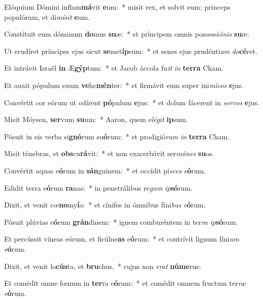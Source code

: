 \item Elóquium Dómini inflam\textbf{má}vit \textbf{e}um:~* misit rex, et solvit eum; princeps populórum, et di\textit{mí}\textit{sit} \textbf{e}um.
\item Constítuit eum dóminum \textbf{do}mus \textbf{su}æ:~* et príncipem omnis possessi\textit{ó}\textit{nis} \textbf{su}æ:
\item Ut erudíret príncipes ejus sicut \textbf{se}met\textbf{íp}sum:~* et senes ejus prudénti\textit{am} \textit{do}\textbf{cé}ret.
\item Et intrávit Israël \textbf{in} Æ\textbf{gýp}tum:~* et Jacob áccola fu\textit{it} \textit{in} \textbf{ter}\textbf{ra} Cham.
\item Et auxit pópulum suum \textbf{ve}he\textbf{mén}ter:~* et firmávit eum super ini\textit{mí}\textit{cos} \textbf{e}jus.
\item Convértit cor eórum ut odírent \textbf{pó}pulum \textbf{e}jus:~* et dolum fácerent in \textit{ser}\textit{vos} \textbf{e}jus.
\item Misit Móysen, \textbf{ser}vum \textbf{su}um:~* Aaron, quem e\textit{lé}\textit{git} \textbf{ip}sum.
\item Pósuit in eis verba si\textbf{gnó}rum su\textbf{ó}rum:~* et prodigió\textit{rum} \textit{in} \textbf{ter}\textbf{ra} Cham.
\item Misit ténebras, et \textbf{obs}cu\textbf{rá}vit:~* et non exacerbávit ser\textit{mó}\textit{nes} \textbf{su}os.
\item Convértit aquas e\textbf{ó}rum in \textbf{sán}guinem:~* et occídit pi\textit{sces} \textit{e}\textbf{ó}rum.
\item Edidit terra e\textbf{ó}rum \textbf{ra}nas:~* in penetrálibus re\textit{gum} \textit{ip}\textbf{só}rum.
\item Dixit, et venit cœ\textbf{no}my\textbf{í}a:~* et cínifes in ómnibus fíni\textit{bus} \textit{e}\textbf{ó}rum.
\item Pósuit plúvias e\textbf{ó}rum \textbf{grán}dinem:~* ignem comburéntem in ter\textit{ra} \textit{ip}\textbf{só}rum.
\item Et percússit víneas eórum, et ficúlne\textbf{as} e\textbf{ó}rum:~* et contrívit lignum fíni\textit{um} \textit{e}\textbf{ó}rum.
\item Dixit, et venit lo\textbf{cús}ta, et \textbf{bru}chus,~* cujus non \textit{e}\textit{rat} \textbf{nú}\textbf{me}rus:
\item Et comédit omne fœnum in \textbf{ter}ra e\textbf{ó}rum:~* et comédit omnem fructum ter\textit{ræ} \textit{e}\textbf{ó}rum.
